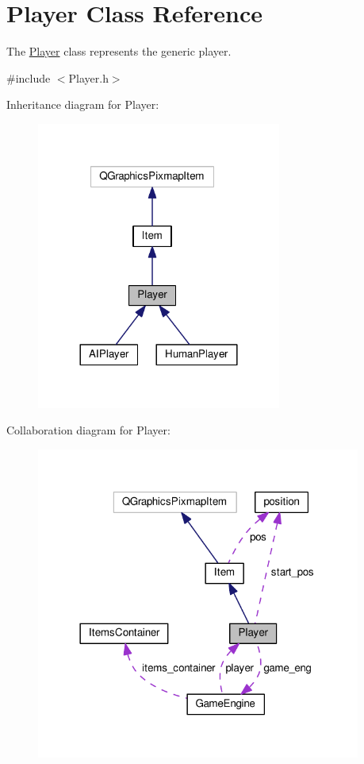 \hypertarget{class_player}{}\section{Player Class Reference}
\label{class_player}


The \hyperlink{class_player}{Player} class represents the generic player.  




{\ttfamily \#include $<$Player.\+h$>$}



Inheritance diagram for Player\+:
\nopagebreak
\begin{figure}[H]
\begin{center}
\leavevmode
\includegraphics[width=228pt]{class_player__inherit__graph}
\end{center}
\end{figure}


Collaboration diagram for Player\+:
\nopagebreak
\begin{figure}[H]
\begin{center}
\leavevmode
\includegraphics[width=302pt]{class_player__coll__graph}
\end{center}
\end{figure}
